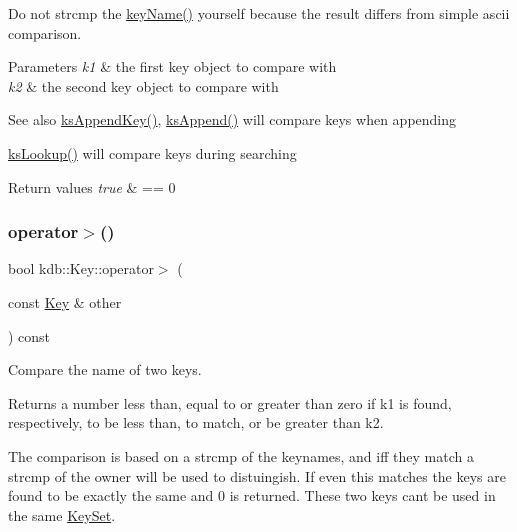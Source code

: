 Do not strcmp the \mbox{\hyperlink{group__keyname_ga8e805c726a60da921d3736cda7813513}{key\+Name()}} yourself because the result differs from simple ascii comparison.


\begin{DoxyParams}{Parameters}
{\em k1} & the first key object to compare with \\
\hline
{\em k2} & the second key object to compare with\\
\hline
\end{DoxyParams}
\begin{DoxySeeAlso}{See also}
\mbox{\hyperlink{group__keyset_gaa5a1d467a4d71041edce68ea7748ce45}{ks\+Append\+Key()}}, \mbox{\hyperlink{group__keyset_ga21eb9c3a14a604ee3a8bdc779232e7b7}{ks\+Append()}} will compare keys when appending 

\mbox{\hyperlink{group__keyset_gaa34fc43a081e6b01e4120daa6c112004}{ks\+Lookup()}} will compare keys during searching
\end{DoxySeeAlso}

\begin{DoxyRetVals}{Return values}
{\em true} & == 0 \\
\hline
\end{DoxyRetVals}
\mbox{\label{classkdb_1_1Key_af616a48861b70b93e6f5955206c9257e}} 
\subsubsection{\texorpdfstring{operator$>$()}{operator>()}}
{\footnotesize\ttfamily bool kdb\+::\+Key\+::operator$>$ (\begin{DoxyParamCaption}\item[{const \mbox{\hyperlink{classkdb_1_1Key}{Key}} \&}]{other }\end{DoxyParamCaption}) const\hspace{0.3cm}{\ttfamily [inline]}}



Compare the name of two keys. 

\begin{DoxyReturn}{Returns}
a number less than, equal to or greater than zero if k1 is found, respectively, to be less than, to match, or be greater than k2.
\end{DoxyReturn}
The comparison is based on a strcmp of the keynames, and iff they match a strcmp of the owner will be used to distuingish. If even this matches the keys are found to be exactly the same and 0 is returned. These two keys can\textquotesingle{}t be used in the same \mbox{\hyperlink{classkdb_1_1KeySet}{Key\+Set}}.

